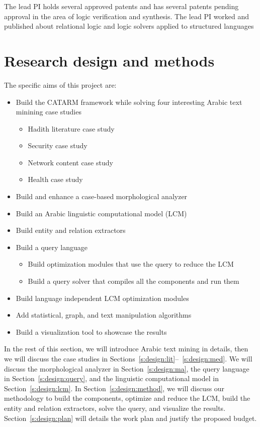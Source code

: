 \documentclass[12pt]{article}
\begin{document}
The lead PI holds several approved patents and has several 
patents pending approval in the area of logic verification 
and synthesis.
The lead PI worked and published about relational logic and 
logic solvers applied to structured languages~\cite{seraICSE07,Zara05}

\section{Research design and methods}
\label{s:designmethods}

The specific aims of this project are:
\begin{itemize}
\item Build the CATARM framework while solving four interesting Arabic 
text minining case studies
  \begin{itemize}
  \item Hadith literature case study
  \item Security case study
  \item Network content case study
  \item Health case study
  \end{itemize}
\item Build and enhance a case-based morphological analyzer
\item Build an Arabic linguistic computational model (LCM)
\item Build entity and relation extractors
\item Build a query language 
  \begin{itemize}
  \item Build optimization modules that use the query to reduce the LCM
  \item Build a query solver that compiles all the components and run them 
  \end{itemize}
\item Build language independent LCM optimization modules
\item Add statistical, graph, and text manipulation algorithms
\item Build a visualization tool to showcase the results 
\end{itemize}


In the rest of this section, we will introduce Arabic text mining in 
details, then we will discuss the case studies in 
Sections~\ref{s:design:lit}--~\ref{s:design:med}. 
We will discuss the morphological analyzer in Section~\ref{s:design:ma}, 
the query language in Section~\ref{s:design:query}, and the linguistic
computational model in Section~\ref{s:design:lcm}.
In Section~\ref{s:design:method}, we will discuss our methodology
to build the components, optimize and reduce the LCM, build the
entity and relation extractors, solve the query, and visualize the 
results. 
Section~\ref{s:design:plan} will details the work plan and
justify the proposed budget.
\end{document}
